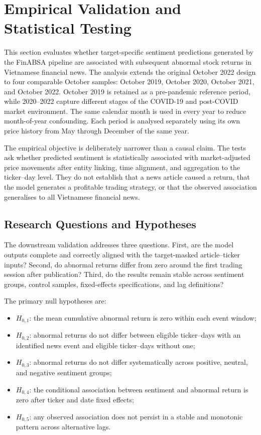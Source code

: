 \documentclass[12pt,a4paper]{article}
\begin{document}
\section{Empirical Validation and Statistical Testing}
\label{sec:empirical-validation}

This section evaluates whether target-specific sentiment predictions generated by the FinABSA pipeline are associated with subsequent abnormal stock returns in Vietnamese financial news. The analysis extends the original October 2022 design to four comparable October samples: October 2019, October 2020, October 2021, and October 2022. October 2019 is retained as a pre-pandemic reference period, while 2020--2022 capture different stages of the COVID-19 and post-COVID market environment. The same calendar month is used in every year to reduce month-of-year confounding. Each period is analysed separately using its own price history from May through December of the same year.

The empirical objective is deliberately narrower than a causal claim. The tests ask whether predicted sentiment is statistically associated with market-adjusted price movements after entity linking, time alignment, and aggregation to the ticker--day level. They do not establish that a news article caused a return, that the model generates a profitable trading strategy, or that the observed association generalises to all Vietnamese financial news.

\subsection{Research Questions and Hypotheses}
\label{subsec:research-questions-statistics}

The downstream validation addresses three questions. First, are the model outputs complete and correctly aligned with the target-masked article--ticker inputs? Second, do abnormal returns differ from zero around the first trading session after publication? Third, do the results remain stable across sentiment groups, control samples, fixed-effects specifications, and lag definitions?

The primary null hypotheses are:
\begin{itemize}
    \item $H_{0,1}$: the mean cumulative abnormal return is zero within each event window;
    \item $H_{0,2}$: abnormal returns do not differ between eligible ticker--days with an identified news event and eligible ticker--days without one;
    \item $H_{0,3}$: abnormal returns do not differ systematically across positive, neutral, and negative sentiment groups;
    \item $H_{0,4}$: the conditional association between sentiment and abnormal return is zero after ticker and date fixed effects;
    \item $H_{0,5}$: any observed association does not persist in a stable and monotonic pattern across alternative lags.
\end{itemize}
\end{document}
